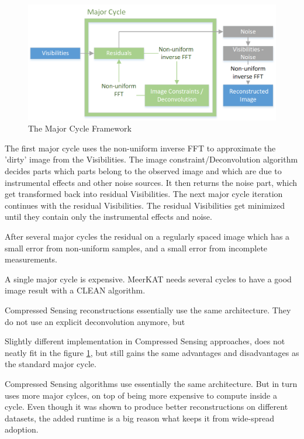 \begin{figure}
	\centering
	\vspace{-10pt}
	\includegraphics[width=1.0\linewidth]{./chapters/01.intro/Major-Minor.png}
	\caption{The Major Cycle Framework}
	\label{intro:major}
	\vspace{-10pt}
\end{figure}

The first major cycle uses the non-uniform inverse FFT to approximate the 'dirty' image from the Visibilities. The image constraint/Deconvolution algorithm decides parts which parts belong to the observed image and which are due to instrumental effects and other noise sources. It then returns the noise part, which get transformed back into residual Visibilities. The next major cycle iteration continues with the residual Visibilities. The residual Visibilities get minimized until they contain only the instrumental effects and noise.

After several major cycles the residual  on a regularly spaced image which has a small error from non-uniform samples, and a small error from incomplete measurements.

A single major cycle is expensive. MeerKAT needs several cycles to have a good image result with a CLEAN algorithm.


Compressed Sensing reconstructions essentially use the same architecture. They do not use an explicit deconvolution anymore, but 

Slightly different implementation in Compressed Sensing approaches, does not neatly fit in the figure \ref{intro:major}, but still gains the same advantages and disadvantages as the standard major cycle. 

Compressed Sensing algorithms use essentially the same architecture. But in turn uses more major cylces, on top of being more expensive to compute inside a cycle. Even though it was shown to produce better reconstructions on different datasets, the added runtime is a big reason what keeps it from wide-spread adoption. 


